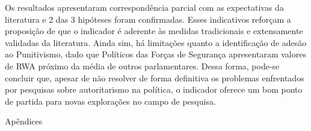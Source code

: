 \documentclass[
12pt,				%
openright,			%
twoside,			%
a4paper,			%
english,			%
french,				%
spanish,			%
brazil				%
]{abntex2}
\begin{document}
Os resultados apresentaram correspondência parcial com as expectativas da literatura e 2 das 3 hipóteses foram confirmadas. Esses indicativos reforçam a proposição de que o indicador é aderente às medidas tradicionais e extensamente validadas da literatura. Ainda sim, há limitações quanto a identificação de adesão ao Punitivismo, dado que Políticos das Forças de Segurança apresentaram valores de RWA próximo da média de outros parlamentares. Dessa forma, pode-se concluir que, apesar de não resolver de forma definitiva os problemas enfrentados por pesquisas sobre autoritarismo na política, o indicador oferece um bom ponto de partida para novas explorações no campo de pesquisa.


\postextual



%
%


Apêndices

\printindex
\end{document}
